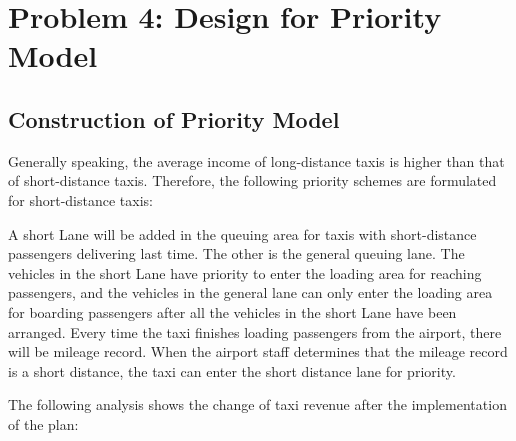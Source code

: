 \section{Problem 4: Design for Priority Model}
\subsection{Construction of Priority Model}
Generally speaking, the average income of long-distance taxis is higher than that of short-distance taxis. Therefore, the following priority schemes are formulated for short-distance taxis:

A short Lane will be added in the queuing area for taxis with short-distance passengers delivering last time. The other is the general queuing lane. The vehicles in the short Lane have priority to enter the loading area for reaching passengers, and the vehicles in the general lane can only enter the loading area for boarding passengers after all the vehicles in the short Lane have been arranged. Every time the taxi finishes loading passengers from the airport, there will be mileage record. When the airport staff determines that the mileage record is a short distance, the taxi can enter the short distance lane for priority.

The following analysis shows the change of taxi revenue after the implementation of the plan:

